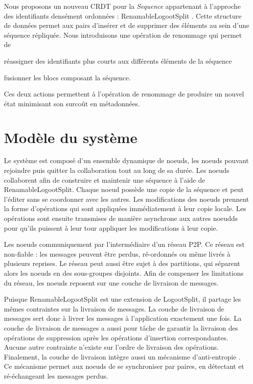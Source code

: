 \documentclass[12pt]{thesul}
\begin{document}
Nous proposons un nouveau \ac{CRDT} pour la \emph{Sequence} appartenant à l'approche des identifiants densément ordonnées : RenamableLogootSplit \cite{nicolas:hal-01932552,nicolas:hal-02526724}.
Cette structure de données permet aux pairs d'insérer et de supprimer des éléments au sein d'une séquence répliquée.
Nous introduisons une opération de renommage qui permet de
\begin{enumerate*}
  \item réassigner des identifiants plus courts aux différents éléments de la séquence
  \item fusionner les blocs composant la séquence.
\end{enumerate*}
Ces deux actions permettent à l'opération de renommage de produire un nouvel état minimisant son surcoût en métadonnées.

\section{Modèle du système}

Le système est composé d'un ensemble dynamique de noeuds, les noeuds pouvant rejoindre puis quitter la collaboration tout au long de sa durée.
Les noeuds collaborent afin de construire et maintenir une séquence à l'aide de RenamableLogootSplit.
Chaque noeud possède une copie de la séquence et peut l'éditer sans se coordonner avec les autres.
Les modifications des noeuds prennent la forme d'opérations qui sont appliquées immédiatement à leur copie locale.
Les opérations sont ensuite transmises de manière asynchrone aux autres noeudds pour qu'ils puissent à leur tour appliquer les modifications à leur copie.

Les noeuds communiquement par l'intermédiaire d'un réseau \ac{P2P}.
Ce réseau est non-fiable : les messages peuvent être perdus, ré-ordonnés ou même livrés à plusieurs reprises.
Le réseau peut aussi être sujet à des partitions, qui séparent alors les noeuds en des sous-groupes disjoints.
Afin de compenser les limitations du réseau, les noeuds reposent sur une couche de livraison de messages.

Puisque RenamableLogootSplit est une extension de LogootSplit, il partage les mêmes contraintes sur la livraison de messages.
La couche de livraison de messages sert donc à livrer les messages à l'application exactement une fois.
La couche de livraison de messages a aussi pour tâche de garantir la livraison des opérations de suppression après les opérations d'insertion correspondantes.
Aucune autre contrainte n'existe sur l'ordre de livraison des opérations.
Finalement, la couche de livraison intègre aussi un mécanisme d'anti-entropie \cite{10.1109/TSE.1983.236733}.
Ce mécanisme permet aux noeuds de se synchroniser par paires, en détectant et ré-échangeant les messages perdus.
\end{document}
